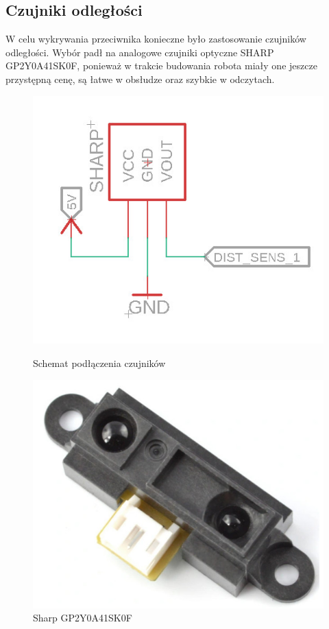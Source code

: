 \documentclass[polish,polish,a4paper]{article}
\begin{document}
    \subsection{Czujniki odległości}
        W celu wykrywania przeciwnika konieczne było zastosowanie czujników odległości. Wybór padł na analogowe czujniki optyczne SHARP GP2Y0A41SK0F, ponieważ w trakcie budowania robota miały one jeszcze przystępną cenę, są łatwe w obsłudze oraz szybkie w odczytach.
        
        \begin{figure}[!htb]
       \begin{minipage}{0.3\textwidth}
         \centering
         \includegraphics[width=1.7\linewidth]{Scheme/czujniki_odleglosci.jpg}
         \caption{Schemat podłączenia czujników}\label{Fig:Data1}
       \end{minipage}\hfill
       \begin{minipage}{0.3\textwidth}
         \centering
         \includegraphics[width=.6\linewidth]{photo/sharp.jpg}
         \caption{Sharp GP2Y0A41SK0F}\label{Fig:Data2}
       \end{minipage}
        \end{figure}
\newpage
\end{document}
